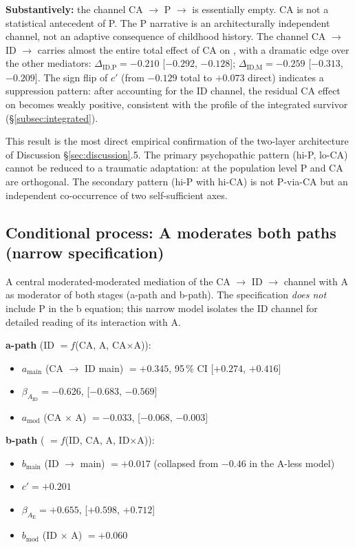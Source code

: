 \textbf{Substantively:} the channel CA $\to$ P $\to$ \EAF{} is essentially empty. CA is not a statistical antecedent of P. The P narrative is an architecturally independent channel, not an adaptive consequence of childhood history. The channel CA $\to$ ID $\to$ \EAF{} carries almost the entire total effect of CA on \EAF{}, with a dramatic edge over the other mediators: $\Delta_{\text{ID,P}} = -0.210$ [$-0.292$, $-0.128$]; $\Delta_{\text{ID,M}} = -0.259$ [$-0.313$, $-0.209$]. The sign flip of $c'$ (from $-0.129$ total to $+0.073$ direct) indicates a suppression pattern: after accounting for the ID channel, the residual CA effect on \EAF{} becomes weakly positive, consistent with the profile of the integrated survivor (§\ref{subsec:integrated}).

This result is the most direct empirical confirmation of the two-layer architecture of Discussion §\ref{sec:discussion}.5. The primary psychopathic pattern (hi-P, lo-CA) cannot be reduced to a traumatic adaptation: at the population level P and CA are orthogonal. The secondary pattern (hi-P with hi-CA) is not P-via-CA but an independent co-occurrence of two self-sufficient axes.

\subsection{Conditional process: A moderates both paths (narrow specification)}
\label{subsec:conditional_process}

A central moderated-moderated mediation of the CA $\to$ ID $\to$ \EAF{} channel with A as moderator of both stages (a-path and b-path). The specification \emph{does not} include P in the b equation; this narrow model isolates the ID channel for detailed reading of its interaction with A.

\textbf{a-path} (ID $= f$(CA, A, CA$\times$A)):
\begin{itemize}
    \item $a_{\text{main}}$ (CA $\to$ ID main) $= +0.345$, 95\,\% CI [$+0.274$, $+0.416$]
    \item $\beta_{A_{\text{ID}}} = \mathbf{-0.626}$, [$-0.683$, $-0.569$]
    \item $a_{\text{mod}}$ (CA $\times$ A) $= \mathbf{-0.033}$, [$-0.068$, $-0.003$]
\end{itemize}

\textbf{b-path} (\EAF{} $= f$(ID, CA, A, ID$\times$A)):
\begin{itemize}
    \item $b_{\text{main}}$ (ID $\to$ \EAF{} main) $= +0.017$ (collapsed from $-0.46$ in the A-less model)
    \item $c' = +0.201$
    \item $\beta_{A_{\text{E}}} = \mathbf{+0.655}$, [$+0.598$, $+0.712$]
    \item $b_{\text{mod}}$ (ID $\times$ A) $= +0.060$
\end{itemize}


